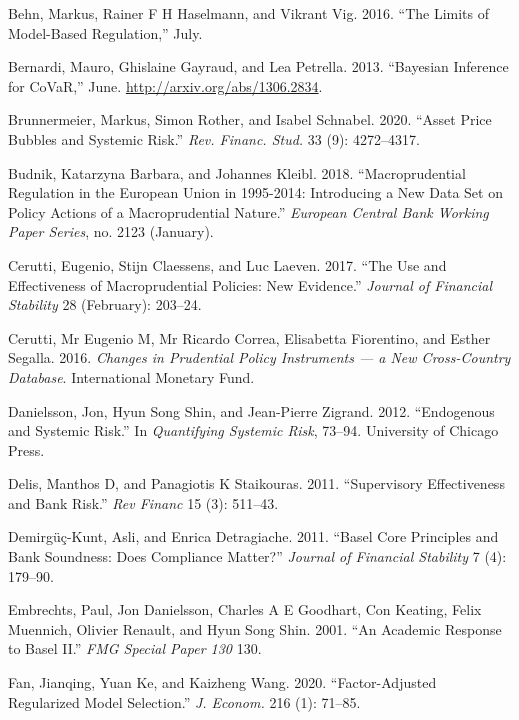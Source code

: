 \documentclass[
  10pt,
]{article}
\begin{document}
\leavevmode\hypertarget{ref-Behn2016}{}%
Behn, Markus, Rainer F H Haselmann, and Vikrant Vig. 2016. ``The Limits
of Model-Based Regulation,'' July.

\leavevmode\hypertarget{ref-Bernardi2013}{}%
Bernardi, Mauro, Ghislaine Gayraud, and Lea Petrella. 2013. ``Bayesian
Inference for CoVaR,'' June. \url{http://arxiv.org/abs/1306.2834}.

\leavevmode\hypertarget{ref-Brunnermeier2020}{}%
Brunnermeier, Markus, Simon Rother, and Isabel Schnabel. 2020. ``Asset
Price Bubbles and Systemic Risk.'' \emph{Rev. Financ. Stud.} 33 (9):
4272--4317.

\leavevmode\hypertarget{ref-Budnik2018}{}%
Budnik, Katarzyna Barbara, and Johannes Kleibl. 2018. ``Macroprudential
Regulation in the European Union in 1995-2014: Introducing a New Data
Set on Policy Actions of a Macroprudential Nature.'' \emph{European
Central Bank Working Paper Series}, no. 2123 (January).

\leavevmode\hypertarget{ref-Cerutti2017}{}%
Cerutti, Eugenio, Stijn Claessens, and Luc Laeven. 2017. ``The Use and
Effectiveness of Macroprudential Policies: New Evidence.'' \emph{Journal
of Financial Stability} 28 (February): 203--24.

\leavevmode\hypertarget{ref-Cerutti2016}{}%
Cerutti, Mr Eugenio M, Mr Ricardo Correa, Elisabetta Fiorentino, and
Esther Segalla. 2016. \emph{Changes in Prudential Policy Instruments ---
a New Cross-Country Database}. International Monetary Fund.

\leavevmode\hypertarget{ref-Danielsson2012}{}%
Danielsson, Jon, Hyun Song Shin, and Jean-Pierre Zigrand. 2012.
``Endogenous and Systemic Risk.'' In \emph{Quantifying Systemic Risk},
73--94. University of Chicago Press.

\leavevmode\hypertarget{ref-Delis2011}{}%
Delis, Manthos D, and Panagiotis K Staikouras. 2011. ``Supervisory
Effectiveness and Bank Risk.'' \emph{Rev Financ} 15 (3): 511--43.

\leavevmode\hypertarget{ref-Demirguc-Kunt2011}{}%
Demirgüç-Kunt, Asli, and Enrica Detragiache. 2011. ``Basel Core
Principles and Bank Soundness: Does Compliance Matter?'' \emph{Journal
of Financial Stability} 7 (4): 179--90.

\leavevmode\hypertarget{ref-Embrechts2001}{}%
Embrechts, Paul, Jon Danielsson, Charles A E Goodhart, Con Keating,
Felix Muennich, Olivier Renault, and Hyun Song Shin. 2001. ``An Academic
Response to Basel II.'' \emph{FMG Special Paper 130} 130.

\leavevmode\hypertarget{ref-Fan2020}{}%
Fan, Jianqing, Yuan Ke, and Kaizheng Wang. 2020. ``Factor-Adjusted
Regularized Model Selection.'' \emph{J. Econom.} 216 (1): 71--85.
\end{document}
